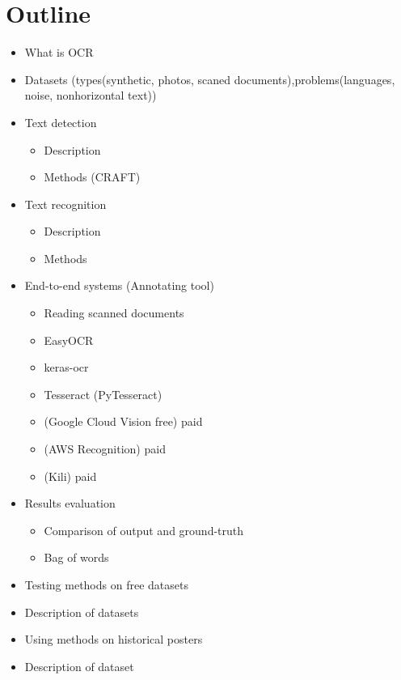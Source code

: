 
\section*{Outline}

\begin{itemize}
    \item What is OCR 
    \item Datasets (types(synthetic, photos, scaned documents),problems(languages, noise, nonhorizontal text))
    \item Text detection
    \begin{itemize}
        \item Description
        \item Methods (CRAFT)
    \end{itemize}
    \item Text recognition
    \begin{itemize}
        \item Description
        \item Methods 
    \end{itemize}
    \item End-to-end systems (Annotating tool)
    \begin{itemize}
        \item[] Reading scanned documents
        \item EasyOCR
        \item keras-ocr
        \item Tesseract (PyTesseract)
        \item (Google Cloud Vision free) paid
        \item (AWS Recognition) paid 
        \item (Kili) paid
    \end{itemize}
    \item Results evaluation
    \begin{itemize}
        \item Comparison of output and ground-truth
        \item Bag of words
    \end{itemize}
    \item Testing methods on free datasets
    \item[] Description of datasets
    \item Using methods on historical posters    
    \item[] Description of dataset

\end{itemize}
\newpage

